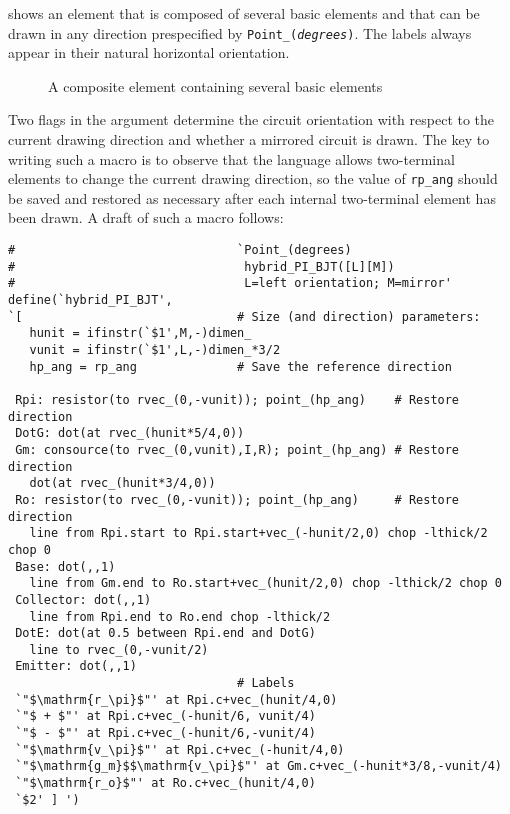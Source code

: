  shows an element that is composed of several basic
elements and that can be drawn in any direction prespecified by
{\tt Point\_({\sl degrees})}. The labels always appear in their natural
horizontal orientation.
\begin{figure}[h!t]
   \vspace*{-0.5ex}
   
   \vspace*{-0.5ex}
   \caption{A composite element containing several basic elements}
   \label{HybridPi}
   \end{figure}
Two flags in the argument determine the circuit orientation with respect to
the current drawing direction and whether a mirrored circuit is drawn.  
The key to writing such a macro is to observe that the \pic language
allows two-terminal elements to change the current drawing direction,
so the value of {\tt rp\_ang} should be saved and restored as necessary
after each internal two-terminal element has been drawn.
A draft of such a macro follows:
\begin{verbatim}
#                               `Point_(degrees)
#                                hybrid_PI_BJT([L][M])
#                                L=left orientation; M=mirror'
define(`hybrid_PI_BJT',
`[                              # Size (and direction) parameters:
   hunit = ifinstr(`$1',M,-)dimen_
   vunit = ifinstr(`$1',L,-)dimen_*3/2
   hp_ang = rp_ang              # Save the reference direction

 Rpi: resistor(to rvec_(0,-vunit)); point_(hp_ang)    # Restore direction
 DotG: dot(at rvec_(hunit*5/4,0))
 Gm: consource(to rvec_(0,vunit),I,R); point_(hp_ang) # Restore direction
   dot(at rvec_(hunit*3/4,0))
 Ro: resistor(to rvec_(0,-vunit)); point_(hp_ang)     # Restore direction
   line from Rpi.start to Rpi.start+vec_(-hunit/2,0) chop -lthick/2 chop 0
 Base: dot(,,1)
   line from Gm.end to Ro.start+vec_(hunit/2,0) chop -lthick/2 chop 0
 Collector: dot(,,1)
   line from Rpi.end to Ro.end chop -lthick/2
 DotE: dot(at 0.5 between Rpi.end and DotG)
   line to rvec_(0,-vunit/2)
 Emitter: dot(,,1)
                                # Labels
 `"$\mathrm{r_\pi}$"' at Rpi.c+vec_(hunit/4,0)
 `"$ + $"' at Rpi.c+vec_(-hunit/6, vunit/4)
 `"$ - $"' at Rpi.c+vec_(-hunit/6,-vunit/4)
 `"$\mathrm{v_\pi}$"' at Rpi.c+vec_(-hunit/4,0)
 `"$\mathrm{g_m}$$\mathrm{v_\pi}$"' at Gm.c+vec_(-hunit*3/8,-vunit/4)
 `"$\mathrm{r_o}$"' at Ro.c+vec_(hunit/4,0)
 `$2' ] ')
\end{verbatim}

